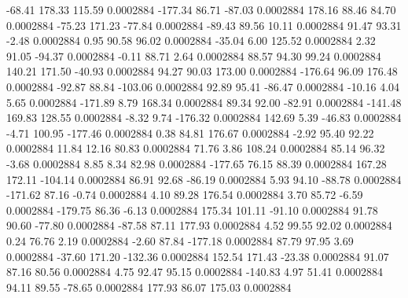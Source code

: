       -68.41      178.33      115.59     0.0002884
     -177.34       86.71      -87.03     0.0002884
      178.16       88.46       84.70     0.0002884
      -75.23      171.23      -77.84     0.0002884
      -89.43       89.56       10.11     0.0002884
       91.47       93.31       -2.48     0.0002884
        0.95       90.58       96.02     0.0002884
      -35.04        6.00      125.52     0.0002884
        2.32       91.05      -94.37     0.0002884
       -0.11       88.71        2.64     0.0002884
       88.57       94.30       99.24     0.0002884
      140.21      171.50      -40.93     0.0002884
       94.27       90.03      173.00     0.0002884
     -176.64       96.09      176.48     0.0002884
      -92.87       88.84     -103.06     0.0002884
       92.89       95.41      -86.47     0.0002884
      -10.16        4.04        5.65     0.0002884
     -171.89        8.79      168.34     0.0002884
       89.34       92.00      -82.91     0.0002884
     -141.48      169.83      128.55     0.0002884
       -8.32        9.74     -176.32     0.0002884
      142.69        5.39      -46.83     0.0002884
       -4.71      100.95     -177.46     0.0002884
        0.38       84.81      176.67     0.0002884
       -2.92       95.40       92.22     0.0002884
       11.84       12.16       80.83     0.0002884
       71.76        3.86      108.24     0.0002884
       85.14       96.32       -3.68     0.0002884
        8.85        8.34       82.98     0.0002884
     -177.65       76.15       88.39     0.0002884
      167.28      172.11     -104.14     0.0002884
       86.91       92.68      -86.19     0.0002884
        5.93       94.10      -88.78     0.0002884
     -171.62       87.16       -0.74     0.0002884
        4.10       89.28      176.54     0.0002884
        3.70       85.72       -6.59     0.0002884
     -179.75       86.36       -6.13     0.0002884
      175.34      101.11      -91.10     0.0002884
       91.78       90.60      -77.80     0.0002884
      -87.58       87.11      177.93     0.0002884
        4.52       99.55       92.02     0.0002884
        0.24       76.76        2.19     0.0002884
       -2.60       87.84     -177.18     0.0002884
       87.79       97.95        3.69     0.0002884
      -37.60      171.20     -132.36     0.0002884
      152.54      171.43      -23.38     0.0002884
       91.07       87.16       80.56     0.0002884
        4.75       92.47       95.15     0.0002884
     -140.83        4.97       51.41     0.0002884
       94.11       89.55      -78.65     0.0002884
      177.93       86.07      175.03     0.0002884
